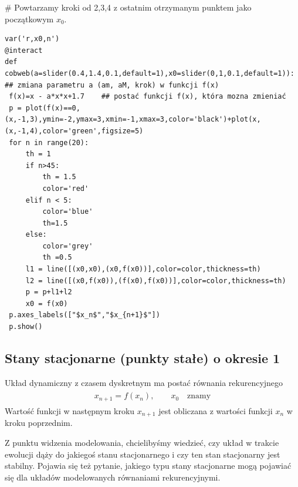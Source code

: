 \documentclass[a4paper,12pt,polish]{sphinxmanual}
\begin{document}
\# Powtarzamy kroki od 2,3,4 z ostatnim otrzymanym punktem jako początkowym $x_0$.


\begin{verbatim}
var('r,x0,n')
@interact
def cobweb(a=slider(0.4,1.4,0.1,default=1),x0=slider(0,1,0.1,default=1)): ## zmiana parametru a (am, aM, krok) w funkcji f(x)
 f(x)=x - a*x*x+1.7    ## postać funkcji f(x), która mozna zmieniać
 p = plot(f(x)==0,(x,-1,3),ymin=-2,ymax=3,xmin=-1,xmax=3,color='black')+plot(x,(x,-1,4),color='green',figsize=5)
 for n in range(20):
     th = 1
     if n>45:
         th = 1.5
         color='red'
     elif n < 5:
         color='blue'
         th=1.5
     else:
         color='grey'
         th =0.5
     l1 = line([(x0,x0),(x0,f(x0))],color=color,thickness=th)
     l2 = line([(x0,f(x0)),(f(x0),f(x0))],color=color,thickness=th)
     p = p+l1+l2
     x0 = f(x0)
 p.axes_labels(["$x_n$","$x_{n+1}$"])
 p.show()
\end{verbatim}



\subsection{Stany stacjonarne (punkty stałe) o okresie 1}
\label{ch1/chI031:stany-stacjonarne-punkty-stale-o-okresie-1}
Układ dynamiczny z czasem dyskretnym ma postać równania rekurencyjnego
\label{ch1/chI031:equation-eqn5}\begin{gather}
\begin{split}x_{n+1} = f(x_n), \quad \quad x_0  \quad \mbox{znamy}\end{split}\label{ch1/chI031-eqn5}
\end{gather}
Wartość funkcji w następnym kroku  $x_{n+1}$  jest obliczana z wartości  funkcji   $x_n$  w kroku poprzednim.

Z punktu widzenia modelowania,  chcielibyśmy wiedzieć, czy układ w trakcie ewolucji dąży do jakiegoś stanu stacjonarnego i czy ten stan stacjonarny jest stabilny. Pojawia się też pytanie, jakiego typu stany stacjonarne mogą pojawiać się dla układów modelowanych równaniami rekurencyjnymi.
\end{document}
